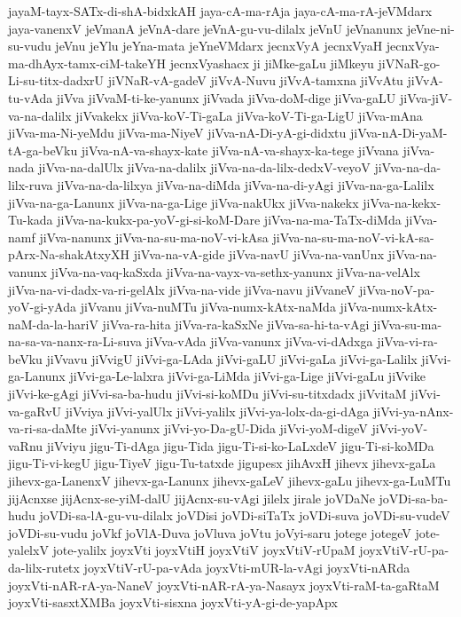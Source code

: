 {jayaM-tayx-SATx-di-shA-bidxkAH
jaya-cA-ma-rAja
jaya-cA-ma-rA-jeVMdarx
jaya-vanenxV
jeVmanA
jeVnA-dare
jeVnA-gu-vu-dilalx
jeVnU
jeVnanunx
jeVne-ni-su-vudu
jeVnu
jeYlu
jeYna-mata
jeYneVMdarx
jecnxVyA
jecnxVyaH
jecnxVya-ma-dhAyx-tamx-ciM-takeYH
jecnxVyashacx
ji
jiMke-gaLu
jiMkeyu
jiVNaR-go-Li-su-titx-dadxrU
jiVNaR-vA-gadeV
jiVvA-Nuvu
jiVvA-tamxna
jiVvAtu
jiVvA-tu-vAda
jiVva
jiVvaM-ti-ke-yanunx
jiVvada
jiVva-doM-dige
jiVva-gaLU
jiVva-jiV-va-na-dalilx
jiVvakekx
jiVva-koV-Ti-gaLa
jiVva-koV-Ti-ga-LigU
jiVva-mAna
jiVva-ma-Ni-yeMdu
jiVva-ma-NiyeV
jiVva-nA-Di-yA-gi-didxtu
jiVva-nA-Di-yaM-tA-ga-beVku
jiVva-nA-va-shayx-kate
jiVva-nA-va-shayx-ka-tege
jiVvana
jiVva-nada
jiVva-na-dalUlx
jiVva-na-dalilx
jiVva-na-da-lilx-dedxV-veyoV
jiVva-na-da-lilx-ruva
jiVva-na-da-lilxya
jiVva-na-diMda
jiVva-na-di-yAgi
jiVva-na-ga-Lalilx
jiVva-na-ga-Lanunx
jiVva-na-ga-Lige
jiVva-nakUkx
jiVva-nakekx
jiVva-na-kekx-Tu-kada
jiVva-na-kukx-pa-yoV-gi-si-koM-Dare
jiVva-na-ma-TaTx-diMda
jiVva-namf
jiVva-nanunx
jiVva-na-su-ma-noV-vi-kAsa
jiVva-na-su-ma-noV-vi-kA-sa-pArx-Na-shakAtxyXH
jiVva-na-vA-gide
jiVva-navU
jiVva-na-vanUnx
jiVva-na-vanunx
jiVva-na-vaq-kaSxda
jiVva-na-vayx-va-sethx-yanunx
jiVva-na-velAlx
jiVva-na-vi-dadx-va-ri-gelAlx
jiVva-na-vide
jiVva-navu
jiVvaneV
jiVva-noV-pa-yoV-gi-yAda
jiVvanu
jiVva-nuMTu
jiVva-numx-kAtx-naMda
jiVva-numx-kAtx-naM-da-la-hariV
jiVva-ra-hita
jiVva-ra-kaSxNe
jiVva-sa-hi-ta-vAgi
jiVva-su-ma-na-sa-va-nanx-ra-Li-suva
jiVva-vAda
jiVva-vanunx
jiVva-vi-dAdxga
jiVva-vi-ra-beVku
jiVvavu
jiVvigU
jiVvi-ga-LAda
jiVvi-gaLU
jiVvi-gaLa
jiVvi-ga-Lalilx
jiVvi-ga-Lanunx
jiVvi-ga-Le-lalxra
jiVvi-ga-LiMda
jiVvi-ga-Lige
jiVvi-gaLu
jiVvike
jiVvi-ke-gAgi
jiVvi-sa-ba-hudu
jiVvi-si-koMDu
jiVvi-su-titxdadx
jiVvitaM
jiVvi-va-gaRvU
jiVviya
jiVvi-yalUlx
jiVvi-yalilx
jiVvi-ya-lolx-da-gi-dAga
jiVvi-ya-nAnx-va-ri-sa-daMte
jiVvi-yanunx
jiVvi-yo-Da-gU-Dida
jiVvi-yoM-digeV
jiVvi-yoV-vaRnu
jiVviyu
jigu-Ti-dAga
jigu-Tida
jigu-Ti-si-ko-LaLxdeV
jigu-Ti-si-koMDa
jigu-Ti-vi-kegU
jigu-TiyeV
jigu-Tu-tatxde
jigupesx
jihAvxH
jihevx
jihevx-gaLa
jihevx-ga-LanenxV
jihevx-ga-Lanunx
jihevx-gaLeV
jihevx-gaLu
jihevx-ga-LuMTu
jijAcnxse
jijAcnx-se-yiM-dalU
jijAcnx-su-vAgi
jilelx
jirale
joVDaNe
joVDi-sa-ba-hudu
joVDi-sa-lA-gu-vu-dilalx
joVDisi
joVDi-siTaTx
joVDi-suva
joVDi-su-vudeV
joVDi-su-vudu
joVkf
joVlA-Duva
joVluva
joVtu
joVyi-saru
jotege
jotegeV
jote-yalelxV
jote-yalilx
joyxVti
joyxVtiH
joyxVtiV
joyxVtiV-rUpaM
joyxVtiV-rU-pa-da-lilx-rutetx
joyxVtiV-rU-pa-vAda
joyxVti-mUR-la-vAgi
joyxVti-nARda
joyxVti-nAR-rA-ya-NaneV
joyxVti-nAR-rA-ya-Nasayx
joyxVti-raM-ta-gaRtaM
joyxVti-sasxtXMBa
joyxVti-sisxna
joyxVti-yA-gi-de-yapApx
}
